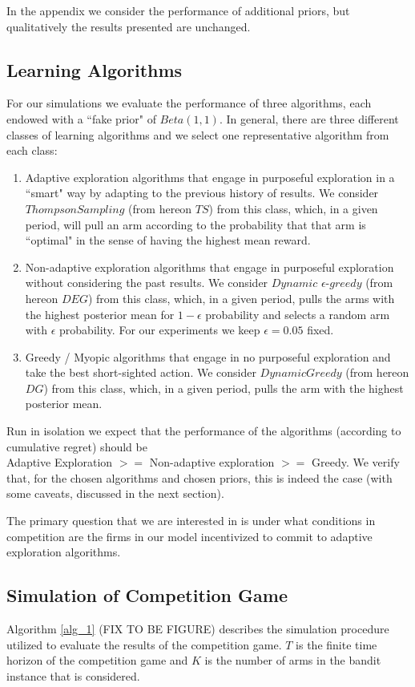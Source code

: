 \documentclass{article}
\theoremstyle{definition}
\begin{document}
In the appendix we consider the performance of additional priors, but qualitatively the results presented are unchanged.

\subsection{Learning Algorithms}

For our simulations we evaluate the performance of three algorithms, each endowed with a ``fake prior" of $Beta(1, 1)$. In general, there are three different classes of learning algorithms and we select one representative algorithm from each class: 
\begin{enumerate}
\item Adaptive exploration algorithms that engage in purposeful exploration in a ``smart" way by adapting to the previous history of results. We consider $Thompson Sampling$ (from hereon $TS$) from this class, which, in a given period, will pull an arm according to the probability that that arm is ``optimal" in the sense of having the highest mean reward.
\item Non-adaptive exploration algorithms that engage in purposeful exploration without considering the past results. We consider $Dynamic$ $\epsilon$-$greedy$ (from hereon $DEG$) from this class, which, in a given period, pulls the arms with the highest posterior mean for $1 - \epsilon$ probability and selects a random arm with $\epsilon$ probability. For our experiments we keep $\epsilon = 0.05$ fixed.
\item Greedy / Myopic algorithms that engage in no purposeful exploration and take the best short-sighted action. We consider $DynamicGreedy$ (from hereon $DG$) from this class, which, in a given period, pulls the arm with the highest posterior mean.
\end{enumerate}

Run in isolation we expect that the performance of the algorithms (according to cumulative regret) should be \\
 Adaptive Exploration $>=$ Non-adaptive exploration $>=$ Greedy. We verify that, for the chosen algorithms and chosen priors, this is indeed the case (with some caveats, discussed in the next section).

The primary question that we are interested in is under what conditions in competition are the firms in our model incentivized to commit to adaptive exploration algorithms.

\subsection{Simulation of Competition Game}
Algorithm \ref{alg_1} (FIX TO BE FIGURE) describes the simulation procedure utilized to evaluate the results of the competition game. $T$ is the finite time horizon of the competition game and $K$ is the number of arms in the bandit instance that is considered.
\end{document}
